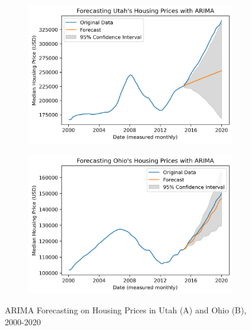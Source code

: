 \documentclass[11pt]{amsart}
\begin{document}
\begin{figure}[h]
    \centering
    \begin{subfigure}{0.45\textwidth}
        \centering
        \includegraphics[width=\linewidth]{figures/utah_forecast.png}
        \caption{}
        \label{fig:utah forecast}
    \end{subfigure}
    \hfill
    \begin{subfigure}{0.45\textwidth}
        \centering
        \includegraphics[width=\linewidth]{figures/ohio_forecast.png}
        \caption{}
        \label{fig:ohio forecast}
    \end{subfigure}
    \caption{ARIMA Forecasting on Housing Prices in Utah (A) and Ohio (B), 2000-2020}
    \label{fig:utah and ohio forecast}
\end{figure}
\end{document}
